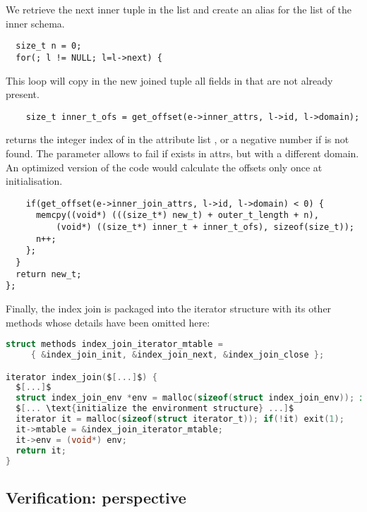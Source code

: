 \documentclass[11pt]{article}
\begin{document}
{{We retrieve the next inner tuple in the list and create an alias for the list of the inner schema.

\begin{lstlisting}
  size_t n = 0;
  for(; l != NULL; l=l->next) {
\end{lstlisting}

This loop will copy in the new joined tuple all fields in  that are not already present.

\begin{lstlisting}
    size_t inner_t_ofs = get_offset(e->inner_attrs, l->id, l->domain);
\end{lstlisting}

 returns the integer index of  in the attribute list , or a negative number if  is not found.
The  parameter allows to fail if  exists in attrs, but with a different domain.
An optimized version of the code would calculate the offsets only once at initialisation.

\begin{lstlisting}
    if(get_offset(e->inner_join_attrs, l->id, l->domain) < 0) {
      memcpy((void*) (((size_t*) new_t) + outer_t_length + n),
          (void*) ((size_t*) inner_t + inner_t_ofs), sizeof(size_t));
      n++;
    };
  }
  return new_t;
};
\end{lstlisting}
}

Finally, the index join is packaged into the iterator structure with its other methods whose details have been omitted here:

\begin{lstlisting}[language=C, basicstyle=\footnotesize, mathescape]
struct methods index_join_iterator_mtable =
     { &index_join_init, &index_join_next, &index_join_close };

iterator index_join($[...]$) {
  $[...]$
  struct index_join_env *env = malloc(sizeof(struct index_join_env)); if(!env) exit(1);
  $[... \text{initialize the environment structure} ...]$
  iterator it = malloc(sizeof(struct iterator_t)); if(!it) exit(1);
  it->mtable = &index_join_iterator_mtable;
  it->env = (void*) env;
  return it;
}
\end{lstlisting}

\subsection{Verification: perspective}

}
\end{document}
